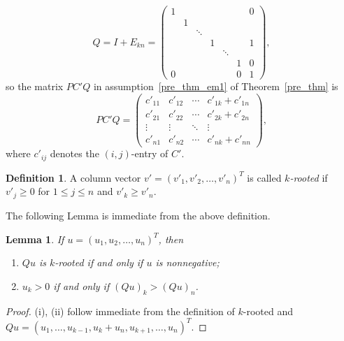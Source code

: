 \documentclass[12pt, a4paper]{article}
\theoremstyle{plain}
\newtheorem{lem}[thm]{Lemma}
\theoremstyle{definition}
\newtheorem{defn}[thm]{Definition}
\begin{document}
\begin{equation} \label{Q_1}
Q=I+E_{kn}=\begin{pmatrix}
1 &   &        &       &        &   & 0 \\
  & 1 &        &       &        &   &   \\
  &   & \ddots &       &        &   &   \\
  &   &        & 1     &        &   & 1 \\
  &   &        &       &\ddots  &   &  \\
  &   &        &       &        &1  & 0 \\
0 &   &        &       &        &0  & 1
\end{pmatrix},
\end{equation}
so the matrix $PC'Q$ in assumption~\ref{pre_thm_em1} of Theorem~\ref{pre_thm} is
\begin{equation}\label{PC'Q}
  PC'Q=\begin{pmatrix}
         c'_{11} & c'_{12} & \cdots &  c'_{1k}+c'_{1n} \\
         c'_{21} & c'_{22} & \cdots &  c'_{2k}+c'_{2n} \\
         \vdots & \vdots & \ddots &  \vdots \\
         c'_{n1} & c'_{n2} & \cdots &  c'_{nk}+c'_{nn}
       \end{pmatrix},
\end{equation}
where $c'_{ij}$ denotes the $(i,j)$-entry of $C'$.






\begin{defn}%
A column vector $v'=(v'_1,v'_2,\ldots,v'_n)^T$ is called {\it $k$-rooted} if $v'_{j} \geq 0$ for $1 \leq  j \leq n$ and $v'_k\geq v'_n$.
\end{defn}

The following Lemma is immediate from the above definition.

\begin{lem}\label{lem:rt_vec}
If $u=(u_1, u_2, \ldots, u_n)^T$, then
\begin{enumerate}[label=(\roman*)]
\item \label{lem:rt_vec:en1} $Qu$ is $k$-rooted  if and only if $u$ is nonnegative;
\item $u_k>0$ if and only if $(Qu)_k>(Qu)_n$.
\end{enumerate}
\end{lem}

\begin{proof}
(i), (ii) follow immediate from the definition of $k$-rooted and
 $Qu=(u_1,\ldots, u_{k-1},u_k+u_n, u_{k+1}, \ldots,  u_n)^T$.
\end{proof}
\end{document}
